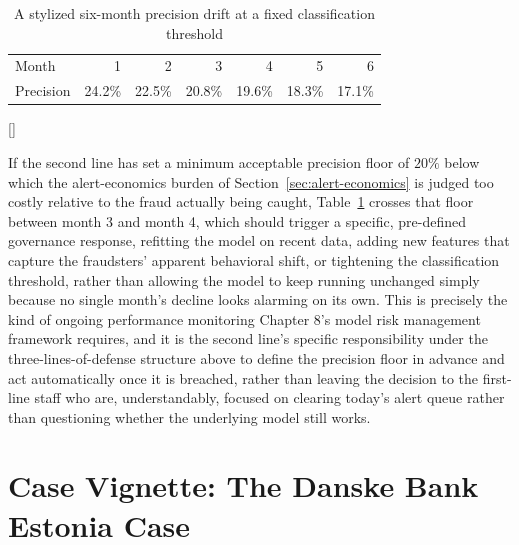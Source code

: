 \documentclass[../ai_in_finance]{subfiles}
\begin{document}
\begin{table}[htbp]
\centering
\begin{lrbox}{\bookmeasuredbox}
\begin{tabular}{lrrrrrr}
\toprule
Month & 1 & 2 & 3 & 4 & 5 & 6 \\
Precision & 24.2\% & 22.5\% & 20.8\% & 19.6\% & 18.3\% & 17.1\% \\
\bottomrule
\end{tabular}
\end{lrbox}
\ifdim\wd\bookmeasuredbox<0.65\linewidth
\setlength{\bookcapwidth}{0.65\linewidth}
\else
\setlength{\bookcapwidth}{\wd\bookmeasuredbox}
\fi
{}[\bookcapwidth]{
\usebox{\bookmeasuredbox}
}{
\caption{A stylized six-month precision drift at a fixed classification threshold}
\label{tab:precision_drift}
}
\end{table}

If the second line has set a minimum acceptable precision floor of $20\%$ below which the alert-economics burden of Section~\ref{sec:alert-economics} is judged too costly relative to the fraud actually being caught, Table~\ref{tab:precision_drift} crosses that floor between month 3 and month 4, which should trigger a specific, pre-defined governance response, refitting the model on recent data, adding new features that capture the fraudsters' apparent behavioral shift, or tightening the classification threshold, rather than allowing the model to keep running unchanged simply because no single month's decline looks alarming on its own. This is precisely the kind of ongoing performance monitoring Chapter 8's model risk management framework requires, and it is the second line's specific responsibility under the three-lines-of-defense structure above to define the precision floor in advance and act automatically once it is breached, rather than leaving the decision to the first-line staff who are, understandably, focused on clearing today's alert queue rather than questioning whether the underlying model still works.

\section{Case Vignette: The Danske Bank Estonia Case}
\end{document}
